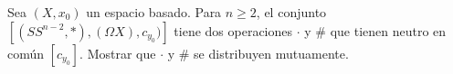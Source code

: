 \begin{ejercicio}
\label{eje: dot and cat distributive}
    Sea $(X,x_0)$ un espacio basado. Para $n\geq 2$, el conjunto $[(SS^{n-2},*),(\Omega X),c_{y_0})]$ tiene dos operaciones $\cdot$ y $\#$ que tienen neutro en común $[c_{y_0}]$. Mostrar que $\cdot$ y $\#$ se distribuyen mutuamente.
\end{ejercicio}

\begin{demostracion}

\end{demostracion}
